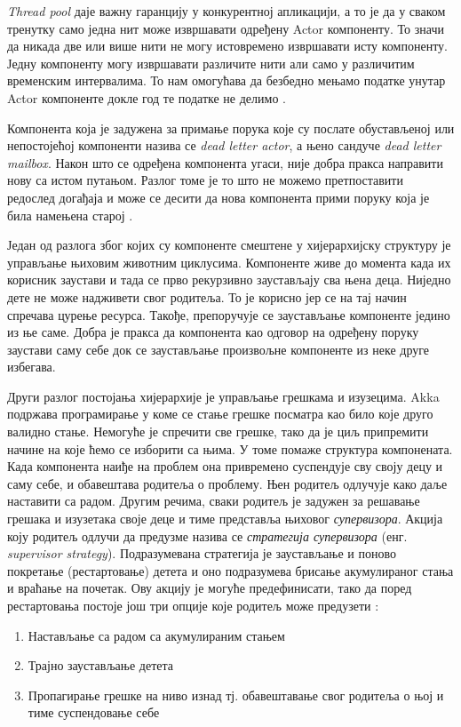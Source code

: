 \documentclass[12pt,oneside]{memoir}
\begin{document}
\textit{Thread pool} даје важну гаранцију у конкурентној апликацији, а то је да у сваком тренутку само једна нит може извршавати одређену Actor компоненту. То значи да никада две или више нити не могу истовремено извршавати исту компоненту. Једну компоненту могу извршавати различите нити али само у различитим временским интервалима. То нам омогућава да безбедно мењамо податке унутар Actor компоненте докле год те податке не делимо \cite{progInScala3, akkaDoc}. 
\\
\par Компонента која је задужена за примање порука које су послате обустављеној или непостојећој компоненти назива се \textit{dead letter actor}, а њено сандуче \textit{dead letter mailbox}. Након што се одређена компонента угаси, није добра пракса направити нову са истом путањом. Разлог томе је то што не можемо претпоставити редослед догађаја и може се десити да нова компонента прими поруку која је била намењена старој \cite{akkaDoc}.
\\
\par Један од разлога због којих су компоненте смештене у хијерархијску структуру је управљање њиховим животним циклусима. Компоненте живе до момента када их корисник заустави и тада се прво рекурзивно заустављају сва њена деца. Ниједно дете не може надживети свог родитеља. То је корисно јер се на тај начин спречава цурење ресурса. Такође, препоручује се заустављање компоненте једино из ње саме. Добра је пракса да компонента као одговор на одређену поруку заустави саму себе док се заустављање произвољне компоненте из неке друге избегава.

Други разлог постојања хијерархије је управљање грешкама и изузецима. Akka подржава програмирање у коме се стање грешке посматра као било које друго валидно стање. Немогуће је спречити све грешке, тако да је циљ припремити начине на које ћемо се изборити са њима. У томе помаже структура компонената. Када компонента наиђе на проблем она привремено суспендује сву своју децу и саму себе, и обавештава родитеља о проблему. Њен родитељ одлучује како даље наставити са радом. Другим речима, сваки родитељ је задужен за решавање грешака и изузетака своје деце и тиме представља њиховог \textit{супервизора}. Акција коју родитељ одлучи да предузме назива се \textit{стратегија супервизора} (енг. \textit{supervisor strategy}). Подразумевана стратегија је заустављање и поново покретање (рестартовање) детета и оно подразумева брисање акумулираног стања и враћање на почетак. Ову акцију је могуће предефинисати, тако да поред рестартовања постоје још три опције које родитељ може предузети \cite{progInScala3, akkaDoc}:
\begin{enumerate}[1)]
\item Настављање са радом са акумулираним стањем
\item Трајно заустављање детета
\item Пропагирање грешке на ниво изнад тј. обавештавање свог родитеља о њој и тиме суспендовање себе
\end{enumerate}
\end{document}
